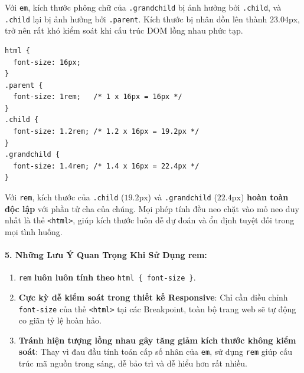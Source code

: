 \documentclass[11pt,oneside]{book}
\newcommand{\codeinline}[1]{\textcolor{accentOrange}{\texttt{#1}}}
\begin{document}
\begin{warnBox}
Với \codeinline{em}, kích thước phông chữ của \codeinline{.grandchild} bị ảnh hưởng bởi \codeinline{.child}, và \codeinline{.child} lại bị ảnh hưởng bởi \codeinline{.parent}. Kích thước bị nhân dồn lên thành $23.04\text{px}$, trở nên rất khó kiểm soát khi cấu trúc DOM lồng nhau phức tạp.
\end{warnBox}

\begin{codeWindow}
\begin{lstlisting}[language=CSS3]
html {
  font-size: 16px;
}
.parent {
  font-size: 1rem;   /* 1 x 16px = 16px */
}
.child {
  font-size: 1.2rem; /* 1.2 x 16px = 19.2px */
}
.grandchild {
  font-size: 1.4rem; /* 1.4 x 16px = 22.4px */
}
\end{lstlisting}
\end{codeWindow}

\begin{conceptBox}
Với \codeinline{rem}, kích thước của \codeinline{.child} ($19.2\text{px}$) và \codeinline{.grandchild} ($22.4\text{px}$) \textbf{hoàn toàn độc lập} với phần tử cha của chúng. Mọi phép tính đều neo chặt vào mỏ neo duy nhất là thẻ \codeinline{<html>}, giúp kích thước luôn dễ dự đoán và ổn định tuyệt đối trong mọi tình huống.
\end{conceptBox}

\paragraph{5. Những Lưu Ý Quan Trọng Khi Sử Dụng rem:}
\begin{enumerate}[leftmargin=1.5em, itemsep=2pt, parsep=0pt]
    \item \codeinline{rem} \textbf{luôn luôn tính theo} \codeinline{html \{ font-size \}}.
    \item \textbf{Cực kỳ dễ kiểm soát trong thiết kế Responsive}: Chỉ cần điều chỉnh \codeinline{font-size} của thẻ \codeinline{<html>} tại các Breakpoint, toàn bộ trang web sẽ tự động co giãn tỷ lệ hoàn hảo.
    \item \textbf{Tránh hiện tượng lồng nhau gây tăng giảm kích thước không kiểm soát}: Thay vì đau đầu tính toán cấp số nhân của \codeinline{em}, sử dụng \codeinline{rem} giúp cấu trúc mã nguồn trong sáng, dễ bảo trì và dễ hiểu hơn rất nhiều.
\end{enumerate}
\end{document}
